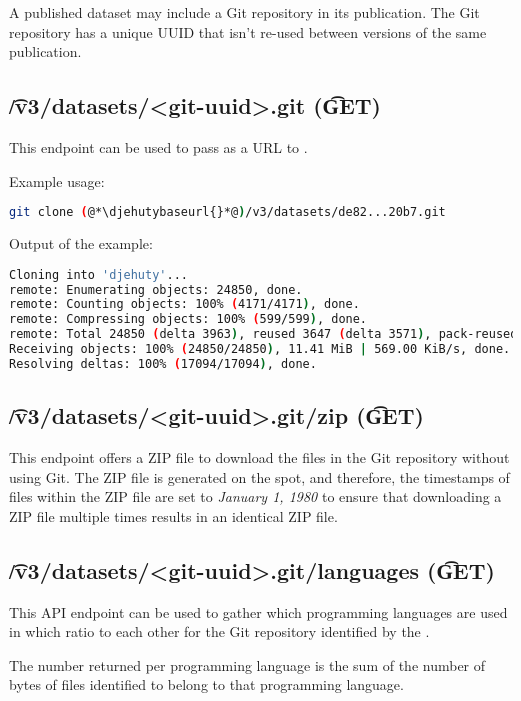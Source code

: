   A published dataset may include a Git repository in its publication.
  The Git repository has a unique UUID that isn't re-used between versions
  of the same publication.

\subsection{\t{/v3/datasets/<git-uuid>.git} (\t{GET})}

  This endpoint can be used to pass as a URL to .

  Example usage:
\begin{lstlisting}[language=bash]
git clone (@*\djehutybaseurl{}*@)/v3/datasets/de82...20b7.git
\end{lstlisting}

  Output of the example:
\begin{lstlisting}[language=bash]
Cloning into 'djehuty'...
remote: Enumerating objects: 24850, done.
remote: Counting objects: 100% (4171/4171), done.
remote: Compressing objects: 100% (599/599), done.
remote: Total 24850 (delta 3963), reused 3647 (delta 3571), pack-reused 20679 (from 2)
Receiving objects: 100% (24850/24850), 11.41 MiB | 569.00 KiB/s, done.
Resolving deltas: 100% (17094/17094), done.
\end{lstlisting}

\subsection{\t{/v3/datasets/<git-uuid>.git/zip} (\t{GET})}

  This endpoint offers a ZIP file to download the files in the Git
  repository without using Git.  The ZIP file is generated on the
  spot, and therefore, the timestamps of files within the
  ZIP file are set to \textit{January 1, 1980} to ensure that
  downloading a ZIP file multiple times results in an identical
  ZIP file.

\subsection{\t{/v3/datasets/<git-uuid>.git/languages} (\t{GET})}

  This API endpoint can be used to gather which programming languages are
  used in which ratio to each other for the Git repository identified by
  the .

  The number returned per programming language is the sum of the number
  of bytes of files identified to belong to that programming language.

